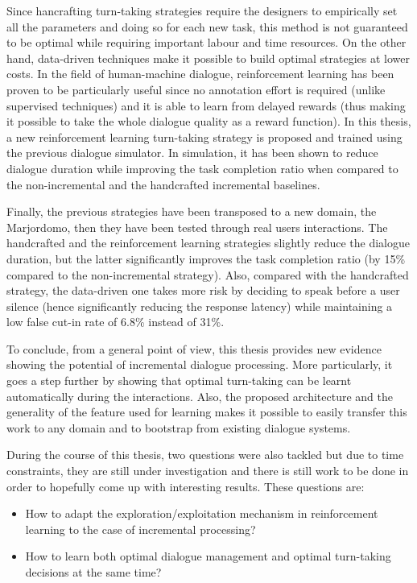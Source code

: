         Since hancrafting turn-taking strategies require the designers to empirically set all the parameters and doing so for each new task, this method is not guaranteed to be optimal while requiring important labour and time resources. On the other hand, data-driven techniques make it possible to build optimal strategies at lower costs. In the field of human-machine dialogue, reinforcement learning has been proven to be particularly useful since no annotation effort is required (unlike supervised techniques) and it is able to learn from delayed rewards (thus making it possible to take the whole dialogue quality as a reward function). In this thesis, a new reinforcement learning turn-taking strategy is proposed and trained using the previous dialogue simulator. In simulation, it has been shown to reduce dialogue duration while improving the task completion ratio when compared to the non-incremental and the handcrafted incremental baselines.

        Finally, the previous strategies have been transposed to a new domain, the Marjordomo, then they have been tested through real users interactions. The handcrafted and the reinforcement learning strategies slightly reduce the dialogue duration, but the latter significantly improves the task completion ratio (by 15\% compared to the non-incremental strategy). Also, compared with the handcrafted strategy, the data-driven one takes more risk by deciding to speak before a user silence (hence significantly reducing the response latency) while maintaining a low false cut-in rate of 6.8\% instead of 31\%.

        To conclude, from a general point of view, this thesis provides new evidence showing the potential of incremental dialogue processing. More particularly, it goes a step further by showing that optimal turn-taking can be learnt automatically during the interactions. Also, the proposed architecture and the generality of the feature used for learning makes it possible to easily transfer this work to any domain and to bootstrap from existing dialogue systems.
        
        During the course of this thesis, two questions were also tackled but due to time constraints, they are still under investigation and there is still work to be done in order to hopefully come up with interesting results. These questions are:

        \begin{itemize}
          \item How to adapt the exploration/exploitation mechanism in reinforcement learning to the case of incremental processing?
          \item How to learn both optimal dialogue management and optimal turn-taking decisions at the same time?
        \end{itemize}

